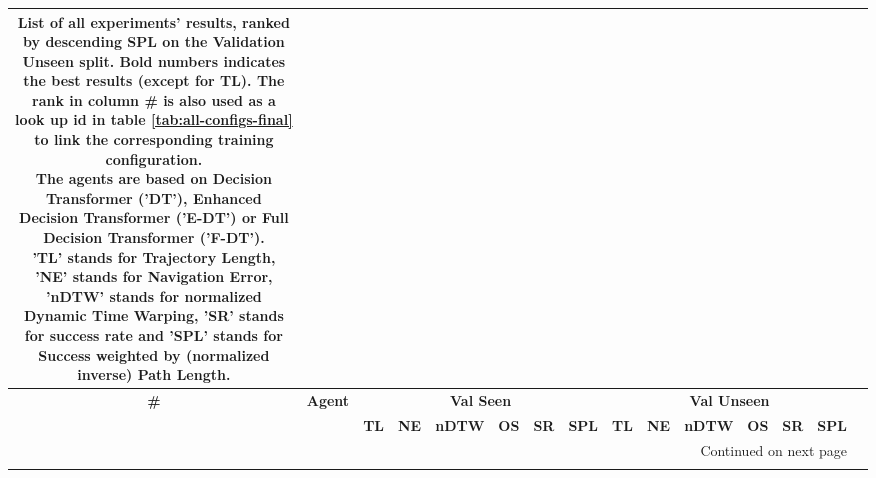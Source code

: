 \begin{longtable}{@{\hskip3pt}c@{\hskip3pt}c@{\hskip3pt}c@{\hskip3pt}c@{\hskip3pt}c@{\hskip3pt}c@{\hskip3pt}c@{\hskip3pt}c@{\hskip3pt}c@{\hskip3pt}c@{\hskip3pt}c@{\hskip3pt}c@{\hskip3pt}c@{\hskip3pt}c@{\hskip3pt}c}
\caption{List of all experiments' results, ranked by descending SPL on the Validation Unseen split. \textbf{Bold} numbers indicates the best results (except for TL). The rank in column \# is also used as a look up id in table \ref{tab:all-configs-final} to link the corresponding training configuration. \newline The agents are based on Decision Transformer ('DT'), Enhanced Decision Transformer ('E-DT') or Full Decision Transformer ('F-DT').\newline 'TL' stands for Trajectory Length, 'NE' stands for Navigation Error, 'nDTW' stands for normalized Dynamic Time Warping, 'SR' stands for success rate and 'SPL' stands for  Success weighted by (normalized inverse) Path Length.}\\
\toprule
\textbf{\#} & \textbf{Agent} & \multicolumn{6}{c}{\textbf{Val Seen}} & \multicolumn{6}{c}{\textbf{Val Unseen}} \\
\cmidrule(l){3-8} \cmidrule(l){9-14} \textbf{~} &     \textbf{~} &       \textbf{TL} &    \textbf{NE} &   \textbf{nDTW} &     \textbf{OS} &     \textbf{SR} &    \textbf{SPL} &         \textbf{TL} &     \textbf{NE} &   \textbf{nDTW} &   \textbf{OS} &    \textbf{SR} &    \textbf{SPL} \\
\midrule
\endhead
\midrule
\multicolumn{14}{r}{{Continued on next page}} \\
\midrule
\endfoot


\end{longtable}
